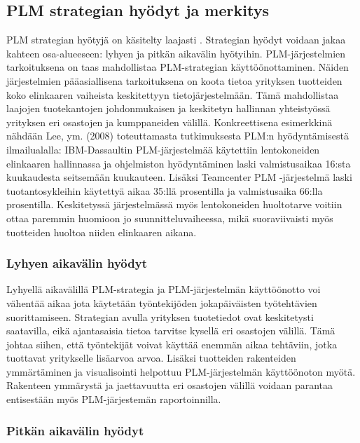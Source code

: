 \subsection{PLM strategian hyödyt ja merkitys} \label{PLM strategian hyödyt}

PLM strategian hyötyjä on käsitelty laajasti \cite{alemanni_key_2008} \cite{rivest_product_2012}. Strategian hyödyt voidaan jakaa kahteen osa-alueeseen: lyhyen ja pitkän aikavälin hyötyihin. PLM-järjestelmien tarkoituksena on taas mahdollistaa PLM-strategian käyttöönottaminen. Näiden järjestelmien pääasiallisena tarkoituksena on koota tietoa yrityksen tuotteiden koko elinkaaren vaiheista keskitettyyn tietojärjestelmään. Tämä mahdollistaa laajojen tuotekantojen johdonmukaisen ja keskitetyn hallinnan yhteistyössä yrityksen eri osastojen ja kumppaneiden välillä. Konkreettisena esimerkkinä nähdään Lee, ym. (2008) toteuttamasta tutkimuksesta PLM:n hyödyntämisestä ilmailualalla: IBM-Dassaultin PLM-järjestelmää käytettiin lentokoneiden elinkaaren hallinnassa ja ohjelmiston hyödyntäminen laski valmistusaikaa 16:sta kuukaudesta seitsemään kuukauteen. Lisäksi Teamcenter PLM -järjestelmä laski tuotantosykleihin käytettyä aikaa 35:llä prosentilla ja valmistusaika 66:lla prosentilla. Keskitetyssä järjestelmässä myös lentokoneiden huoltotarve voitiin ottaa paremmin huomioon jo suunnitteluvaiheessa, mikä suoraviivaisti myös tuotteiden huoltoa niiden elinkaaren aikana. \cite{lee_product_2008}

\subsubsection{Lyhyen aikavälin hyödyt} \label{Lyhyen aikavälin hyödyt}

Lyhyellä aikavälillä PLM-strategia ja PLM-järjestelmän käyttöönotto voi vähentää aikaa jota käytetään työntekijöden jokapäiväisten työtehtävien suorittamiseen. Strategian avulla yrityksen tuotetiedot ovat keskitetysti saatavilla, eikä ajantasaisia tietoa tarvitse kysellä eri osastojen välillä. Tämä johtaa siihen, että työntekijät voivat käyttää enemmän aikaa tehtäviin, jotka tuottavat yritykselle lisäarvoa arvoa. Lisäksi tuotteiden rakenteiden ymmärtäminen ja visualisointi helpottuu PLM-järjestelmän käyttöönoton myötä. Rakenteen ymmärystä ja jaettavuutta eri osastojen välillä voidaan parantaa entisestään myös PLM-järjestemän raportoinnilla. \cite{alemanni_key_2008}

\subsubsection{Pitkän aikavälin hyödyt} \label{Pitkän aikavälin hyödyt}

